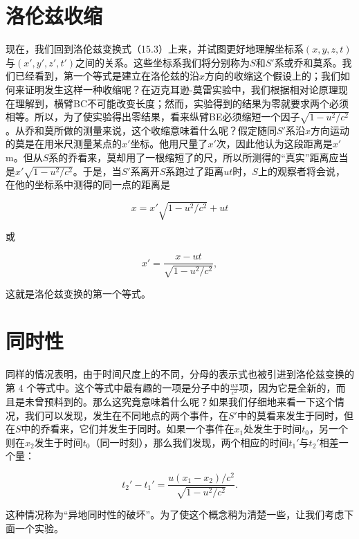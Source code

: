 \documentclass[12pt,oneside]{book}
\begin{document}
\section{洛伦兹收缩}
现在，我们回到洛伦兹变换式（15.3）上来，并试图更好地理解坐标系$ (x,y,z,t) $与$(x',y',z',t')  $之间的关系。这些坐标系我们将分别称为$ S $和$ S' $系或乔和莫系。我们已经看到，第一个等式是建立在洛伦兹的沿$ x $方向的收缩这个假设上的；我们如何来证明发生这样一种收缩呢？在迈克耳逊-莫雷实验中，我们根据相对论原理现在理解到，横臂BC不可能改变长度；然而，实验得到的结果为零就要求两个必须相等。所以，为了使实验得出零结果，看来纵臂BE必须缩短一个因子$\sqrt{1 - u^2/c^2}  $。从乔和莫所做的测量来说，这个收缩意味着什么呢？假定随同$ S′ $系沿$ x $方向运动的莫是在用米尺测量某点的$ x' $坐标。他用尺量了$ x' $次，因此他认为这段距离是$ x' $ m。但从$ S $系的乔看来，莫却用了一根缩短了的尺，所以所测得的“真实”距离应当是$  x'\sqrt{1-u^2/c^2}$。于是，当$ S′ $系离开$ S $系跑过了距离$ ut $时，$ S $上的观察者将会说，在他的坐标系中测得的同一点的距离是

\begin{equation*}
x = x'\sqrt{1-u^2/c^2}+ut
\end{equation*}

或

\begin{equation*}
x'=\frac{x-ut}{\sqrt{1-u^2/c^2}},
\end{equation*}

这就是洛伦兹变换的第一个等式。


\section{同时性}
同样的情况表明，由于时间尺度上的不同，分母的表示式也被引进到洛伦兹变换的第 4 个等式中。这个等式中最有趣的一项是分子中的$\frac{ux}{c^2}$项，因为它是全新的，而且是未曾预料到的。那么这究竟意味着什么呢？如果我们仔细地来看一下这个情况，我们可以发现，发生在不同地点的两个事件，在$S'$中的莫看来发生于同时，但在$S$中的乔看来，它们并发生于同时。如果一个事件在$x_1$处发生于时间$t_0$，另一个则在$x_2$发生于时间$t_0$（同一时刻），那么我们发现，两个相应的时间$t_1'$与$t_2'$相差一个量：


\begin{equation*}
t_2'-t_1'=\frac{u(x_1-x_2)/c^2}{\sqrt{1-u^2/c^2}}.
\end{equation*}

这种情况称为“异地同时性的破坏”。为了使这个概念稍为清楚一些，让我们考虑下面一个实验。
\end{document}
